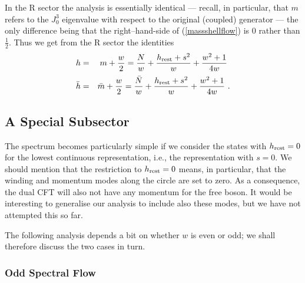 \documentclass[12pt,a4paper]{article}
\begin{document}
In the R sector the analysis is essentially identical --- recall, in particular, that $m$ refers to the $J^3_0$ eigenvalue with respect to the original (coupled) generator --- the only difference being that the right--hand-side of (\ref{massshellflow}) is $0$ rather than $\frac{1}{2}$. Thus we get from the R sector the identities 
\begin{eqnarray}
h & =  & m + \frac{w}{2} = \frac{N}{w} + \frac{h_{\rm rest}  + s^2}{w}  +  \frac{w^2+1}{4w}\ \\[2pt]
\bar{h} & = & \bar{m} + \frac{w}{2} = \frac{\bar{N}}{w} + \frac{h_{\rm rest}  + s^2}{w} + \frac{w^2+1}{4w} \ .
\end{eqnarray}

\subsection{A Special Subsector}

The spectrum becomes particularly simple if we consider the states with $h_{\rm rest}=0$ for the lowest continuous representation, i.e., the representation with $s=0$. We should mention that the restriction to $h_{\rm rest}=0$ means, in particular, that the winding and momentum modes along the circle are set to zero. As a consequence, the dual CFT will also not have any momentum for the free boson. It would be interesting to generalise our analysis to include also these modes, but we have not attempted this so far. 

The following analysis depends a bit on whether $w$ is even or odd; we shall therefore discuss the two cases in turn.

\subsubsection{Odd Spectral Flow }
\end{document}
